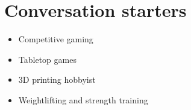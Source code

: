 \documentclass[10pt]{article} %
\begin{document}


\section{Conversation starters}


\setlength{} %

\begin{paracol}{2} %

	\begin{itemize}\itemsep0em 
		\item Competitive gaming
		\item Tabletop games
	\end{itemize}
		
	
	\switchcolumn %
	

	\begin{itemize}\itemsep0em 
		\item 3D printing hobbyist
		\item Weightlifting and strength training
	\end{itemize}

	
\end{paracol}

\medskip %

\end{document}
